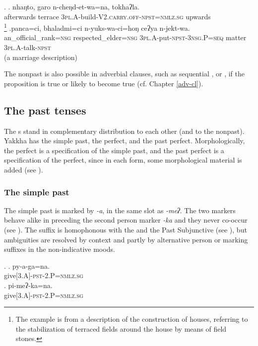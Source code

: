 \ex. \ag. nhaŋto, garo n-cheŋd-et-wa=na,      tokhaʔla.\\
afterwards terrace {\scshape 3pl.A-}build{\scshape -V2.carry.off-npst=nmlz.sg} upwards\\
\footnote{The example is from a description of the  construction of houses, referring to the stabilization of terraced fields around the house by means of field stones.}  
\bg.panca=ci, bhaladmi=ci n-yuks-wa-ci=hoŋ  ceʔya n-jekt-wa.\\
an\_official\_rank{\scshape =nsg} respected\_elder{\scshape =nsg} {\scshape 3pl.A-}put{\scshape -npst-3nsg.P=seq} matter {\scshape 3pl.A-}talk{\scshape -npst}\\
 (a marriage description) 

The nonpast is also possible in adverbial  clauses, such as sequential \Last[b],  or , if the proposition is true or likely to become true (cf. Chapter \ref{adv-cl}). 

\subsection{The past tenses}\label{pst}

The s stand in complementary distribution to each other (and to the nonpast). Yakkha has the simple past, the perfect, and the past perfect. Morphologically, the perfect is a specification of the simple past, and the past perfect is a specification of the perfect, since in each form, some morphological material is added (see ).

\subsubsection{The simple past}\label{sim-pst}

The simple past is marked by \emph{-a}, in the same slot as \emph{-meʔ}. The two markers behave alike in preceding the second person marker \emph{-ka} and they never co-occur (see \Next). The suffix is homophonous with the  and the Past Subjunctive (see ), but ambiguities are resolved by context and partly by alternative person or  marking suffixes in the non-indicative moods.

\ex. \ag.  py-a-ga=na.\\
			give{\scshape [3.A]-pst-2.P=nmlz.sg}\\
	\bg. pi-meʔ-ka=na.\\ 
			give{\scshape [3.A]-pst-2.P=nmlz.sg}\\
			
